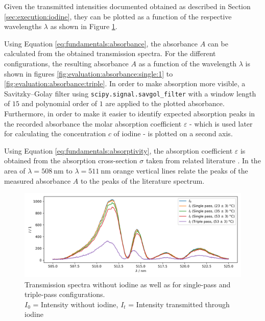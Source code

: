 Given the transmitted intensities documented obtained as described in Section \ref{sec:execution:iodine}, they can be plotted as a function of the respective wavelengths $\lambda$ as shown in Figure \ref{fig:evaluation:transmission}.

Using Equation \ref{eq:fundamentals:absorbance}, the absorbance $A$ can be calculated from the obtained transmission spectra. For the different configurations, the resulting absorbance $A$ as a function of the wavelength $\lambda$ is shown in figures \ref{fig:evaluation:absorbance:single:1} to \ref{fig:evaluation:absorbance:triple}. In order to make absorption more visible, a Savitzky–Golay filter using \verb|scipy.signal.savgol_filter| with a window length of $15$ and polynomial order of $1$ are applied to the plotted absorbance. Furthermore, in order to make it easier to identify expected absorption peaks in the recorded absorbance the molar absorption coefficient $\varepsilon$ - which is used later for calculating the concentration $c$ of iodine - is plotted on a second axis.

Using Equation \ref{eq:fundamentals:absorptivity}, the absorption coefficient $\varepsilon$ is obtained from the absorption cross-section $\sigma$ taken from related literature \cite{Iodine}. In the area of $\lambda = \SI{508}{\nm}$ to $\lambda = \SI{511}{\nm}$ orange vertical lines relate the peaks of the measured absorbance $A$ to the peaks of the literature spectrum.

\begin{figure}[H]
    \centering
    \includegraphics[width=\textwidth]{graphics/transmission.png}
    \caption{Transmission spectra without iodine as well as for single-pass and triple-pass configurations.\\
        $I_0$ = Intensity without iodine, $I_t$ = Intensity transmitted through iodine}
    \label{fig:evaluation:transmission}
\end{figure}


